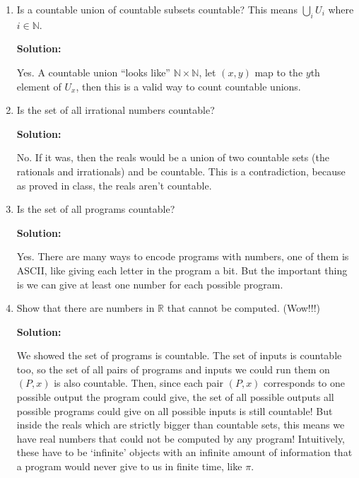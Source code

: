 \documentclass{article}
\newenvironment{solution}{

        \color{blue} \smallskip \textbf{Solution:}

    }{}
\begin{document}
\begin{enumerate}
\begin{solution}
        There is some similar proof for the pairs with one coordinate zero, except now working mod 4.
    \end{solution}
    \item Is a countable union of countable subsets countable? This means $\bigcup_{i} U_i$ where $i \in \mathbb{N}$.
    \begin{solution}
        Yes. A countable union ``looks like'' $\mathbb{N} \times \mathbb{N}$, let $(x, y)$ map to the $y$th element of $U_x$, then
        this is a valid way to count countable unions.
    \end{solution}
    \item Is the set of all irrational numbers countable?
    \begin{solution}
        No. If it was, then the reals would be a union of two countable sets (the rationals and irrationals) and be countable. This is a contradiction,
        because as proved in class, the reals aren't countable.
    \end{solution}
    \item Is the set of all programs countable?
    \begin{solution}
        Yes. There are many ways to encode programs with numbers, one of them is ASCII, like giving each letter in the program a bit. But the important thing is we can give at least
        one number for each possible program.
    \end{solution}
    \item Show that there are numbers in $\mathbb{R}$ that cannot be computed. (Wow!!!)
    \begin{solution}
        We showed the set of programs is countable. The set of inputs is countable too, so the set of all pairs of programs and inputs we could run them
        on $(P, x)$ is also countable. Then, since each pair $(P, x)$ corresponds to one possible output the program could give, the set of all possible outputs
        all possible programs could give on all possible inputs is still countable! But inside the reals which are strictly bigger than countable sets,
        this means we have real numbers that could not be computed by any program! Intuitively, these have to be `infinite' objects with an infinite amount of information
        that a program would never give to us in finite time, like $\pi$.
    \end{solution}
\end{enumerate}
\end{document}
